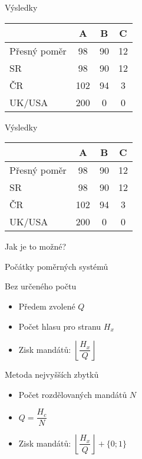 \documentclass[17pt]{beamer}
\begin{document}
\begin{frame}{Výsledky}
\begin{center}
\begin{tabular}{|l|c|c|c|} \hline
  & A & B & C \\ \hline 
Přesný poměr & 98 & 90 & 12\\ \hline
SR & 98 & 90 & 12\\ \hline
ČR & 102 & 94 & 3\\ \hline
UK/USA & 200 & 0 & 0\\ \hline
\end{tabular}
\end{center} 
\end{frame}

\begin{frame}{Výsledky}
\begin{center}
\begin{tabular}{|l|c|c|c|} \hline
  & A & B & C \\ \hline 
Přesný poměr & 98 & 90 & 12\\ \hline
SR & 98 & 90 & 12\\ \hline
ČR & 102 & 94 & 3\\ \hline
UK/USA & 200 & 0 & 0\\ \hline
\end{tabular}
\end{center} 
Jak je to možné?
\end{frame}

\begin{frame}{Počátky poměrných systémů}
\begin{center}
\end{center}
\end{frame}

\begin{frame}{Bez určeného počtu}
\begin{itemize}
\item Předem zvolené $Q$
\item Počet hlasu pro stranu $H_{x}$
\item Zisk mandátů: $\left\lfloor\dfrac{H_{x}}{Q}\right\rfloor$
\end{itemize}
\end{frame}

\begin{frame}{Metoda nejvyšších zbytků}
\begin{itemize}
\item Počet rozdělovaných mandátů $N$
\item $Q=\dfrac{H_{c}}{N}$
\item Zisk mandátů: $\left\lfloor\dfrac{H_{x}}{Q}\right\rfloor+\{0;1\}$
\end{itemize}
\end{frame}
\end{document}
